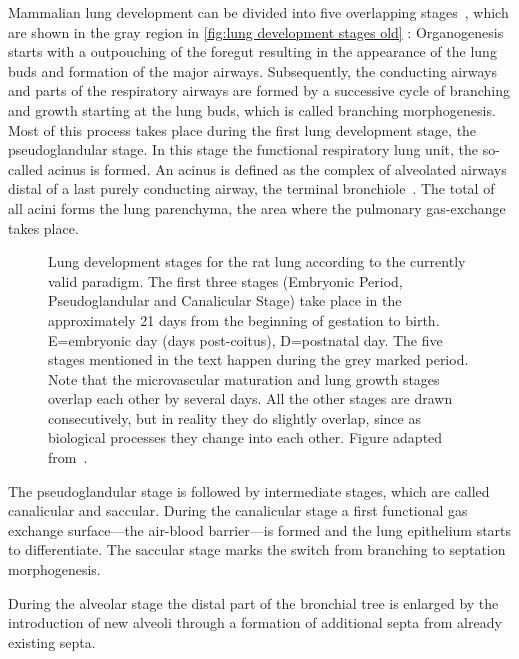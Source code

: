 Mammalian lung development can be divided into five overlapping stages~\cite{Schittny2004,Schittny2007a}, which are shown in the gray region in \autoref{fig:lung development stages old}%
%
: Organogenesis starts with a outpouching of the foregut resulting in the appearance of the lung buds and formation of the major airways. Subsequently, the conducting airways and parts of the respiratory airways are formed by a successive cycle of branching and growth starting at the lung buds, which is called branching morphogenesis. Most of this process takes place during the first lung development stage, the pseudoglandular stage. In this stage the functional respiratory lung unit, the so-called acinus is formed. An acinus is defined as the complex of alveolated airways distal of a last purely conducting airway, the terminal bronchiole~\cite{Rodriguez1987}. The total of all acini forms the lung parenchyma, the area where the pulmonary gas-exchange takes place.

\begin{figure}[htb]
	\noindent\makebox[\textwidth]{%
		\centering%
		}%
	\caption[Lung development stages]{Lung development stages for the rat lung according to the currently valid paradigm. The first three stages (Embryonic Period, Pseudoglandular and Canalicular Stage) take place in the approximately 21 days from the beginning of gestation to birth. E=embryonic day (days post-coitus), D=postnatal day. The five stages mentioned in the text happen during the grey marked period. Note that the microvascular maturation and lung growth stages overlap each other by several days. All the other stages are drawn consecutively, but in reality they do slightly overlap, since as biological processes they change into each other. Figure adapted from~\cite{Schittny2007a}.}
	\label{fig:lung development stages old}
\end{figure}

The pseudoglandular stage is followed by intermediate stages, which are called canalicular and saccular. During the canalicular stage a first functional gas exchange surface---the air-blood barrier---is formed and the lung epithelium starts to differentiate. The saccular stage marks the switch from branching to septation morphogenesis.

During the alveolar stage the distal part of the bronchial tree is enlarged by the introduction of new alveoli through a formation of additional septa from already existing septa. 

